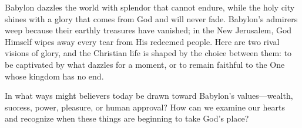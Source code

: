 Babylon dazzles the world with splendor that cannot endure, while the holy city shines with a glory that comes from God and will never fade. Babylon's admirers weep because their earthly treasures have vanished; in the New Jerusalem, God Himself wipes away every tear from His redeemed people. Here are two rival visions of glory, and the Christian life is shaped by the choice between them: to be captivated by what dazzles for a moment, or to remain faithful to the One whose kingdom has no end.

\begin{ReaderQuestion}
In what ways might believers today be drawn toward Babylon's values---wealth, success, power, pleasure, or human approval? How can we examine our hearts and recognize when these things are beginning to take God's place?
\end{ReaderQuestion}



